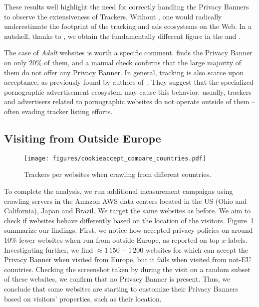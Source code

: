 These results well highlight the need for correctly handling the Privacy Banners to observe the extensiveness of Trackers. Without \TOOL, one would radically underestimate the footprint of the tracking and ads ecosystems on the Web. In a nutshell, thanks to \TOOL, we obtain the fundamentally different figure in the \AFTER and \INTERNAL.

The case of \textit{Adult} websites is worth a specific comment. \TOOL finds the Privacy Banner on only $20\%$ of them, and a manual check confirms that the large majority of them do not offer any Privacy Banner. In general, tracking is also scarce upon acceptance, as previously found by authors of~\cite{vallina2019tales}. They suggest that the specialized pornographic advertisement ecosystem may cause this behavior: usually, trackers and advertisers related to pornographic websites do not operate outside of them -- often evading tracker listing efforts.



\subsection{Visiting from Outside Europe}

\begin{figure}[t]
    \centering
    \texttt{[image: figures/cookieaccept\_compare\_countries.pdf]}
    \caption{Trackers per websites when crawling from different countries.}
    \label{fig:ca_us}
\end{figure}

To complete the analysis, we run additional measurement campaigns using crawling servers in the Amazon AWS data centers located in the US (Ohio and California), Japan and Brazil. We target the same websites as before. We aim to check if websites behave differently based on the location of the visitors. Figure~\ref{fig:ca_us} summarize our findings. First, we notice how \TOOL accepted privacy policies on around $10\%$ fewer websites when run from outside Europe, as reported on top $x$-labels. Investigating further, we find $\approx 1\,150 - 1\,200$ websites for which \TOOL can accept the Privacy Banner when visited from Europe, but it fails when visited from not-EU countries. Checking the screenshot taken by \TOOL during the visit on a random subset of these websites, we confirm that no Privacy Banner is present. Thus, we conclude that some websites are starting to customize their Privacy Banners based on visitors' properties, such as their location.


